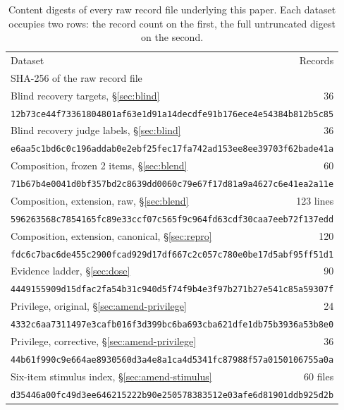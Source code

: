 \documentclass{article}
\begin{document}
\begin{table}[htbp]
  \centering
  \small
  \begin{tabular}{lr}
    \toprule
    Dataset & Records \\
    \multicolumn{2}{l}{\hspace{1em}SHA-256 of the raw record file} \\
    \midrule
    Blind recovery targets, \S\ref{sec:blind} & 36 \\
    \multicolumn{2}{l}{\hspace{1em}\texttt{12b73ce44f73361804801af63e1d91a14decdfe91b176ece4e54384b812b5c85}} \\
    Blind recovery judge labels, \S\ref{sec:blind} & 36 \\
    \multicolumn{2}{l}{\hspace{1em}\texttt{e6aa5c1bd6c0c196addab0e2ebf25fec17fa742ad153ee8ee39703f62bade41a}} \\
    Composition, frozen 2 items, \S\ref{sec:blend} & 60 \\
    \multicolumn{2}{l}{\hspace{1em}\texttt{71b67b4e0041d0bf357bd2c8639dd0060c79e67f17d81a9a4627c6e41ea2a11e}} \\
    Composition, extension, raw, \S\ref{sec:blend} & 123 lines \\
    \multicolumn{2}{l}{\hspace{1em}\texttt{596263568c7854165fc89e33ccf07c565f9c964fd63cdf30caa7eeb72f137edd}} \\
    Composition, extension, canonical, \S\ref{sec:repro} & 120 \\
    \multicolumn{2}{l}{\hspace{1em}\texttt{fdc6c7bac6de455c2900fcad929d17df667c2c057c780e0be17d5abf95ff51d1}} \\
    Evidence ladder, \S\ref{sec:dose} & 90 \\
    \multicolumn{2}{l}{\hspace{1em}\texttt{4449155909d15dfac2fa54b31c940d5f74f9b4e3f97b271b27e541c85a59307f}} \\
    Privilege, original, \S\ref{sec:amend-privilege} & 24 \\
    \multicolumn{2}{l}{\hspace{1em}\texttt{4332c6aa7311497e3cafb016f3d399bc6ba693cba621dfe1db75b3936a53b8e0}} \\
    Privilege, corrective, \S\ref{sec:amend-privilege} & 36 \\
    \multicolumn{2}{l}{\hspace{1em}\texttt{44b61f990c9e664ae8930560d3a4e8a1ca4d5341fc87988f57a0150106755a0a}} \\
    Six-item stimulus index, \S\ref{sec:amend-stimulus} & 60 files \\
    \multicolumn{2}{l}{\hspace{1em}\texttt{d35446a00fc49d3ee646215222b90e250578383512e03afe6d81901ddb925d2b}} \\
    \bottomrule
  \end{tabular}
  \caption{Content digests of every raw record file underlying this paper. Each
  dataset occupies two rows: the record count on the first, the full untruncated
  digest on the second.}
  \label{tab:receipts}
\end{table}
\end{document}
